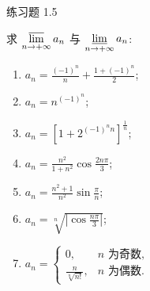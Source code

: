 \begin{exblock}{练习题 1.5}
    \item 求 $\varlimsup\limits_{n\to+\infty} a_n$ 与 $\varliminf\limits_{n\to+\infty} a_n$:
    \begin{enumerate}
        \item $a_n = \frac{(-1)^n}{n} + \frac{1 + (-1)^n}{2}$;
        \item $a_n = n^{(-1)^n}$;
        \item $a_n = \left[1 + 2^{(-1)^n n}\right]^{\frac{1}{n}}$;
        \item $a_n = \frac{n^2}{1+n^2}\cos\frac{2n\pi}{3}$;
        \item $a_n = \frac{n^2+1}{n^2}\sin\frac{\pi}{n}$;
        \item $a_n = \sqrt[n]{\left|\cos\frac{n\pi}{3}\right|}$;
        \item $a_n = \begin{cases} 0, & n \text{ 为奇数},\\ \frac{n}{\sqrt[n]{n!}}, & n \text{ 为偶数}. \end{cases}$
    \end{enumerate}


\end{exblock}
